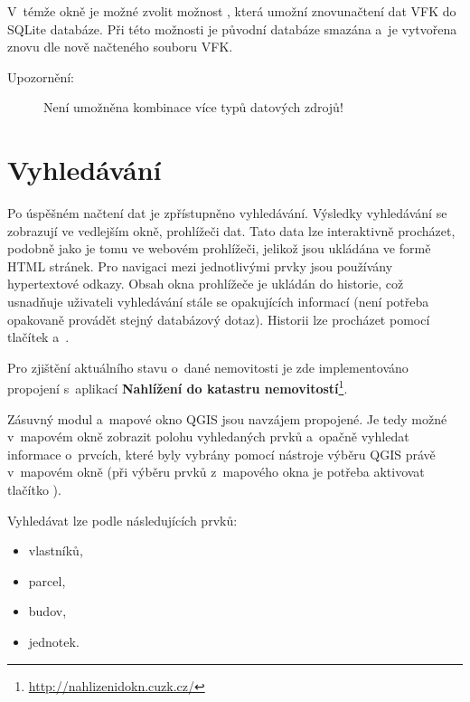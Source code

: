 \documentclass[a4paper,12pt,oneside]{book}
\begin{document}
V~témže okně je možné zvolit možnost , která
umožní znovunačtení dat VFK do SQLite databáze. Při této možnosti je původní
databáze smazána a~je vytvořena znovu dle nově načteného souboru VFK.

\begin{description}
 \item[Upozornění:] Není umožněna kombinace více typů datových zdrojů!
\end{description}


\section{Vyhledávání}
Po úspěšném načtení dat je zpřístupněno vyhledávání. Výsledky
vyhledávání se zobrazují ve vedlejším okně, prohlížeči dat. Tato data
lze interaktivně procházet, podobně jako je tomu ve webovém
prohlížeči, jelikož jsou ukládána ve formě HTML stránek. Pro navigaci
mezi jednotlivými prvky jsou používány hypertextové odkazy. Obsah okna
prohlížeče je ukládán do historie, což usnadňuje uživateli vyhledávání
stále se opakujících informací (není potřeba opakovaně provádět stejný
databázový dotaz). Historii lze procházet pomocí tlačítek 
a~.

Pro zjištění aktuálního stavu o~dané nemovitosti je zde implementováno
propojení s~aplikací \textbf{Nahlížení do katastru
  nemovitostí}\footnote{\url{http://nahlizenidokn.cuzk.cz/}}.

Zásuvný modul a~mapové okno QGIS jsou navzájem propojené. Je tedy
možné v~mapovém okně zobrazit polohu vyhledaných prvků a~opačně
vyhledat informace o~prvcích, které byly vybrány pomocí nástroje
výběru QGIS právě v~mapovém okně (při výběru prvků z~mapového okna je
potřeba aktivovat tlačítko ).

Vyhledávat lze podle následujících prvků:

\begin{itemize}
 \item vlastníků,
 \item parcel,
 \item budov,
 \item jednotek.
\end{itemize}
\end{document}
